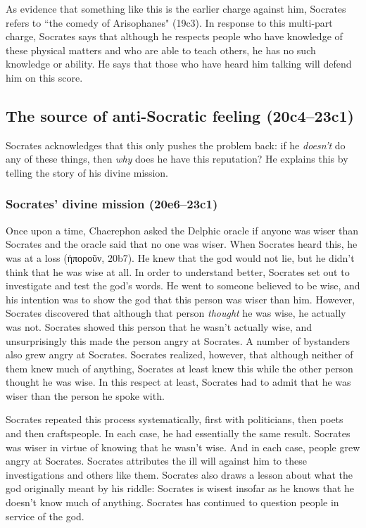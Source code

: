 \documentclass[11pt]{article}
\begin{document}
As evidence that something like this is the earlier charge against him,
Socrates refers to ``the comedy of Arisophanes" (19c3).  In response to
this multi-part charge, Socrates says that although he respects people who
have knowledge of these physical matters and who are able to teach others,
he has no such knowledge or ability.  He says that those who have heard him
talking will defend him on this score.

\subsection{The source of anti-Socratic feeling (20c4--23c1)}

Socrates acknowledges that this only pushes the problem back: if he
\emph{doesn't} do any of these things, then \emph{why} does he have this
reputation?  He explains this by telling the story of his divine mission.

\subsubsection{Socrates' divine mission (20e6--23c1)}

Once upon a time, Chaerephon asked the Delphic oracle if anyone was wiser
than Socrates and the oracle said that no one was wiser.  When Socrates
heard this, he was at a loss (ἠποροῦν, 20b7).  He knew that the god would
not lie, but he didn't think that he was wise at all.  In order to
understand better, Socrates set out to investigate and test the god's
words.  He went to someone believed to be wise, and his intention was to
show the god that this person was wiser than him.  However, Socrates
discovered that although that person \emph{thought} he was wise, he
actually was not.  Socrates showed this person that he wasn't actually
wise, and unsurprisingly this made the person angry at Socrates.  A number
of bystanders also grew angry at Socrates.  Socrates realized, however,
that although neither of them knew much of anything, Socrates at least knew
this while the other person thought he was wise. In this respect at least,
Socrates had to admit that he was wiser than the person he spoke with.

Socrates repeated this process systematically, first with politicians, then
poets and then craftspeople.  In each case, he had essentially the same
result.  Socrates was wiser in virtue of knowing that he wasn't wise.  And
in each case, people grew angry at Socrates.  Socrates attributes the ill
will against him to these investigations and others like them.  Socrates
also draws a lesson about what the god originally meant by his riddle:
Socrates is wisest insofar as he knows that he doesn't know much of
anything.  Socrates has continued to question people in service of the god.
\end{document}
